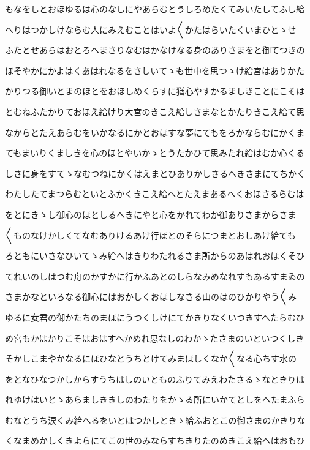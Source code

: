 \documentclass[a4paper,11pt,landscape]{ltjtarticle}
\begin{document}
もなをしとおほゆるは心のなしにやあらむとうしろめたくてみいたしてふし給
\par\medskip
へりはつかしけならむ人にみえむことはいよ〱かたはらいたくいまひとゝせ
\par\medskip
ふたとせあらはおとろへまさりなむはかなけなる身のありさまをと御てつきの
\par\medskip
ほそやかにかよはくあはれなるをさしいてゝも世中を思つゝけ給宮はありかた
\par\medskip
かりつる御いとまのほとをおほしめくらすに猶心やすかるましきことにこそは
\par\medskip
とむねふたかりておほえ給けり大宮のきこえ給しさまなとかたりきこえ給て思
\par\medskip
なからとたえあらむをいかなるにかとおほすな夢にてもをろかならむにかくま
\par\medskip
てもまいりくましきを心のほとやいかゝとうたかひて思みたれ給はむか心くる
\par\medskip
しさに身をすてゝなむつねにかくはえまとひありかしさるへきさまにてちかく
\par\medskip
わたしたてまつらむといとふかくきこえ給へとたえまあるへくおほさるらむは
\par\medskip
をとにきゝし御心のほとしるへきにやと心をかれてわか御ありさまからさま
\par\medskip
〱ものなけかしくてなむありけるあけ行ほとのそらにつまとおしあけ給ても
\par\medskip
ろともにいさなひいてゝみ給へはきりわたれるさま所からのあはれおほくそひ
\par\medskip
てれいのしはつむ舟のかすかに行かふあとのしらなみめなれすもあるすまゐの
\par\medskip
さまかなといろなる御心にはおかしくおほしなさる山のはのひかりやう〱み
\par\medskip
ゆるに女君の御かたちのまほにうつくしけにてかきりなくいつきすへたらむひ
\par\medskip
め宮もかはかりこそはおはすへかめれ思なしのわかゝたさまのいといつくしき
\par\medskip
そかしこまやかなるにほひなとうちとけてみまほしくなか〱なる心ちす水の
\par\medskip
をとなひなつかしからすうちはしのいとものふりてみえわたさるゝなときりは
\par\medskip
れゆけはいとゝあらましききしのわたりをかゝる所にいかてとしをへたまふら
\par\medskip
むなとうち涙くみ給へるをいとはつかしときゝ給ふおとこの御さまのかきりな
\par\medskip
くなまめかしくきよらにてこの世のみならすちきりたのめきこえ給へはおもひ
\end{document}
